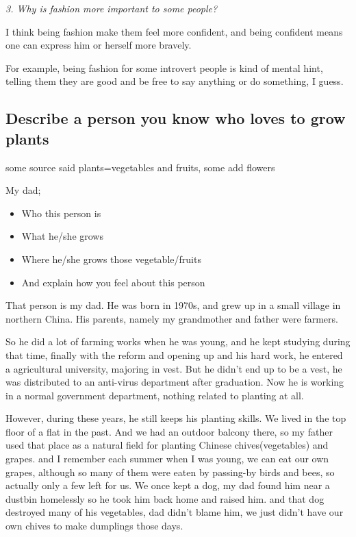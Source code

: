 \documentclass[conference]{IEEEtran}
\begin{document}
\textit{3. Why is fashion more important to some people?}

I think being fashion make them feel more confident, and being confident means one can express him or herself
more bravely.

For example, being fashion for some introvert people is kind of mental hint, telling them they are good and be
free to say anything or do something, I guess.


\subsection{Describe a person you know who loves to grow plants}
some source said plants=vegetables and fruits, some add flowers

My dad;

\begin{itemize}
    \item Who this person is
    \item What he/she grows
    \item Where he/she grows those vegetable/fruits
    \item And explain how you feel about this person
\end{itemize}

That person is my dad. He was born in 1970s, and grew up in a small village in northern China.
His parents, namely my grandmother and father were farmers.

So he did a lot of farming works when he was young, and he kept studying during that time, 
finally with the reform and opening up and his hard work, he entered a agricultural university, majoring in vest.
But he didn't end up to be a vest, he was distributed to an anti-virus department after graduation.
Now he is working in a normal government department, nothing related to planting at all.

However, during these years, he still keeps his planting skills.
We lived in the top floor of a flat in the past. And we had an outdoor balcony there, 
so my father used that place as a natural field for planting Chinese chives(vegetables) and grapes.
and I remember each summer when I was young, we can eat our own grapes, although so many of them were eaten by
passing-by birds and bees, so actually only a few left for us.
We once kept a dog, my dad found him near a dustbin homelessly so he took him back home and raised him.
and that dog destroyed many of his vegetables, dad didn't blame him, we just didn't have our own chives to make
dumplings those days.
\end{document}
